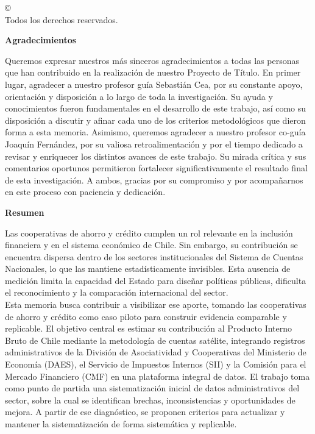   \begin{center}
    \copyright\ \nombreautor\ \the\year{} \\
    Todos los derechos reservados.
  \end{center}
  \cleardoublepage {}
  \begin{center} \Large \textbf{Agradecimientos} \end{center}
  Queremos expresar nuestros más sinceros agradecimientos a todas las personas que han contribuido en la realización de nuestro Proyecto de Título.
En primer lugar, agradecer a nuestro profesor guía Sebastián Cea, por su constante apoyo, orientación y disposición a lo largo de toda la investigación. Su ayuda y conocimientos fueron fundamentales en el desarrollo de este trabajo, así como su disposición a discutir y afinar cada uno de los criterios metodológicos que dieron forma a esta memoria.
Asimismo, queremos agradecer a nuestro profesor co-guía Joaquín Fernández, por su valiosa retroalimentación y por el tiempo dedicado a revisar y enriquecer los distintos avances de este trabajo. Su mirada crítica y sus comentarios oportunos permitieron fortalecer significativamente el resultado final de esta investigación.
A ambos, gracias por su compromiso y por acompañarnos en este proceso con paciencia y dedicación.
  \cleardoublepage
   
  \begin{center} \Large \textbf{Resumen} \end{center}
Las cooperativas de ahorro y crédito cumplen un rol relevante en la inclusión financiera y en el sistema económico de Chile. Sin embargo, su contribución se encuentra dispersa dentro de los sectores institucionales del Sistema de Cuentas Nacionales, lo que las mantiene estadísticamente invisibles. Esta ausencia de medición limita la capacidad del Estado para diseñar políticas públicas, dificulta el reconocimiento y la comparación internacional del sector.\\
Esta memoria busca contribuir a visibilizar ese aporte, tomando las cooperativas de ahorro y crédito como caso piloto para construir evidencia comparable y replicable. El objetivo central es estimar su contribución al Producto Interno Bruto de Chile mediante la metodología de cuentas satélite, integrando registros administrativos de la División de Asociatividad y Cooperativas del Ministerio de Economía (DAES), el Servicio de Impuestos Internos (SII) y la Comisión para el Mercado Financiero (CMF) en una plataforma integral de datos. El trabajo toma como punto de partida una sistematización inicial de datos administrativos del sector, sobre la cual se identifican brechas, inconsistencias y oportunidades de mejora. A partir de ese diagnóstico, se proponen criterios para actualizar y mantener la sistematización de forma sistemática y replicable.\\
